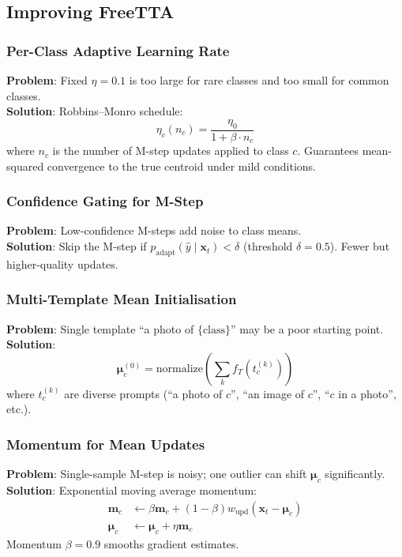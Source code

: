 \documentclass[12pt,a4paper]{article}
\newcommand{\bx}{\mathbf{x}}
\newcommand{\bmu}{\boldsymbol{\mu}}
\newcommand{\1}{\mathbf{1}}
\begin{document}
\subsection{Improving FreeTTA}

\subsubsection{Per-Class Adaptive Learning Rate}
\textbf{Problem}: Fixed $\eta=0.1$ is too large for rare classes and too small for common classes.\\
\textbf{Solution}: Robbins--Monro schedule:
\begin{equation}
  \eta_c(n_c) = \frac{\eta_0}{1 + \beta \cdot n_c}
\end{equation}
where $n_c$ is the number of M-step updates applied to class $c$.
Guarantees mean-squared convergence to the true centroid under mild conditions.

\subsubsection{Confidence Gating for M-Step}
\textbf{Problem}: Low-confidence M-steps add noise to class means.\\
\textbf{Solution}: Skip the M-step if $p_{\text{adapt}}(\hat{y} \mid \bx_t) < \delta$ (threshold $\delta = 0.5$).
Fewer but higher-quality updates.

\subsubsection{Multi-Template Mean Initialisation}
\textbf{Problem}: Single template ``a photo of $\{\text{class}\}$'' may be a poor starting point.\\
\textbf{Solution}:
\begin{equation}
  \bmu_c^{(0)} = \mathrm{normalize}\!\left(\sum_{k} f_T(t_c^{(k)})\right)
\end{equation}
where $t_c^{(k)}$ are diverse prompts (``a photo of $c$'', ``an image of $c$'', ``$c$ in a photo'', etc.).

\subsubsection{Momentum for Mean Updates}
\textbf{Problem}: Single-sample M-step is noisy; one outlier can shift $\bmu_c$ significantly.\\
\textbf{Solution}: Exponential moving average momentum:
\begin{align}
  \mathbf{m}_c &\leftarrow \beta \mathbf{m}_c + (1-\beta) w_{\text{upd}}(\bx_t - \bmu_c) \\
  \bmu_c &\leftarrow \bmu_c + \eta \mathbf{m}_c
\end{align}
Momentum $\beta=0.9$ smooths gradient estimates.
\end{document}
